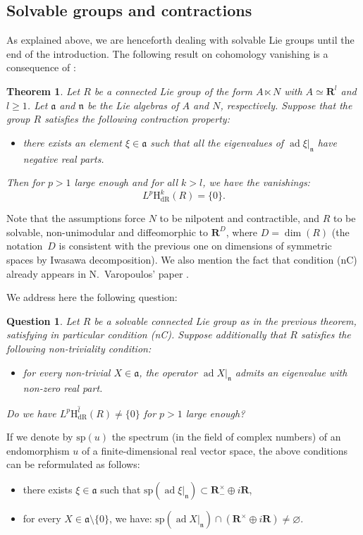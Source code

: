 \documentclass[JEP,XML,SOM,Unicode,published]{cedram}
\newcommand{\dR}{\mathrm{dR}}
\newcommand{\rH}{\mathrm{H}}
\newcommand{\rsp}{\mathrm{sp}}
\newcommand{\fra}{\mathfrak{a}}
\newcommand{\frn}{\mathfrak{n}}
\newcommand{\RR}{\mathbf{R}}
\theoremstyle{plain}
\newtheorem{theorem}[equation]{Theorem}
\newtheorem{question}[equation]{Question}
\theoremstyle{remark}
\theoremstyle{definition}
\DeclareMathOperator{\ad}{ad}
\newcommand{\restr}{\big|}
\begin{document}
\subsection{Solvable groups and contractions}
\label{ss - solvable and contraction}
As explained above, we are henceforth dealing with solvable Lie groups until the end of the introduction.
The following result on cohomology vanishing is a consequence of \cite[Cor.\,53]{Pa99}:

\begin{theorem}
\label{introduction-theorem}
Let $R$ be a connected Lie group of the form $A \ltimes N$ with $A \simeq \RR^l$ and $l \geqslant 1$.
Let $\fra$ and $\frn$ be the Lie algebras of $A$ and $N$, respectively.
Suppose that the group $R$ satisfies the following contraction property:
\begin{itemize}
\item[(nC)] there exists an element $\xi \in \fra$ such that all the eigenvalues of $\ad \xi \restr_\frn$
have negative real parts.
\end{itemize}
Then for $p > 1$ large enough and for all $k >l$, we have the vanishings:
\[
L^p\rH_\dR^k(R) = \{0\}.
\]
\end{theorem}

Note that the assumptions force $N$ to be nilpotent and contractible, and $R$ to be solvable, non-unimodular and diffeomorphic to $\RR^D$, where
$D= \dim(R)$ (the nota\-tion~$D$ is consistent with the previous one on dimensions of symmetric spaces by Iwasawa decomposition).
We also mention the fact that condition (nC) already \hbox{appears} in N.~Varopoulos' paper \cite[OV.3 p.\,799]{Var}.

We address here the following question:

\begin{question}
\label{introduction-question}
Let $R$ be a solvable connected Lie group as in the previous theorem, satisfying in particular condition \textup{(nC)}.
Suppose additionally that $R$ satisfies the following non-triviality condition:
\begin{itemize}
\item[(nT)]for every non-trivial $X \in \fra$, the operator $\ad X \restr_\frn$ admits
an eigenvalue with non-zero real part.
\end{itemize}
Do we have $L^p\overline{\rH_\dR^l}(R) \neq \{0\}$ for $p >1$ large enough?
\end{question}

If we denote by $\rsp(u)$ the spectrum (in the field of complex numbers) of an endomorphism $u$ of a finite-dimensional real vector space, the above conditions can be reformulated as follows:
\begin{itemize}
\item[(nC)]there exists $\xi \in \fra$ such that $\rsp(\ad \xi \restr_\frn) \subset \RR_-^\times \oplus i\RR$,
\item[(nT)]for every $X \in \fra \setminus \{ 0 \}$, we have: $\rsp(\ad X \restr_\frn) \cap (\RR^\times \oplus i\RR) \neq \varnothing$.
\end{itemize}
\end{document}

